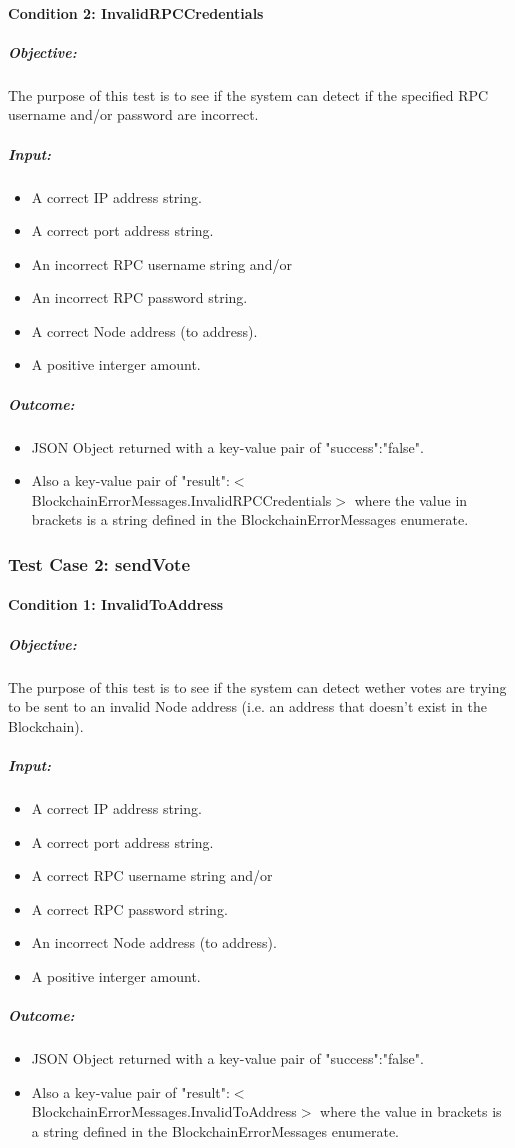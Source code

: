 \documentclass[11pt]{article}
\begin{document}
	\paragraph{Condition 2: InvalidRPCCredentials}	
	\subparagraph{Objective:}
	The purpose of this test is to see if the system can detect if the specified RPC username and/or password are incorrect.
	\subparagraph{Input:}
	\begin{itemize}
		\item A correct IP address string.
		\item A correct port address string.
		\item An incorrect RPC username string and/or
		\item An incorrect RPC password string.
		\item A correct Node address (to address).
		\item A positive interger amount.
	\end{itemize}
	\subparagraph{Outcome:}
	\begin{itemize}
		\item JSON Object returned with a key-value pair of "success":"false".
		\item Also a key-value pair of "result":$<$BlockchainErrorMessages.InvalidRPCCredentials$>$ where the value in brackets is a string defined in the BlockchainErrorMessages enumerate.
	\end{itemize}

	\subsubsection{Test Case 2: sendVote}
	\paragraph{Condition 1: InvalidToAddress}	
	\subparagraph{Objective:}
	The purpose of this test is to see if the system can detect wether votes are trying to be sent to an invalid Node address (i.e. an address that doesn't exist in the Blockchain).
	\subparagraph{Input:}
	\begin{itemize}
		\item A correct IP address string.
		\item A correct port address string.
		\item A correct RPC username string and/or
		\item A correct RPC password string.
		\item An incorrect Node address (to address).
		\item A positive interger amount.
	\end{itemize}
	\subparagraph{Outcome:}
	\begin{itemize}
		\item JSON Object returned with a key-value pair of "success":"false".
		\item Also a key-value pair of "result":$<$BlockchainErrorMessages.InvalidToAddress$>$ where the value in brackets is a string defined in the BlockchainErrorMessages enumerate.
	\end{itemize}
\end{document}
